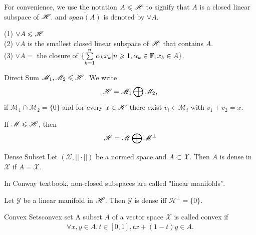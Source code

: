 For convenience, we use the notation $A\leqslant \mathscr{H}$ to signify  that $A$ is a closed linear subspace of $\mathscr{H}$.
and $\overline{span(A)}$ is denoted by $\vee A$.
\begin{proposition}{}{}
    (1) $\vee A\leqslant \mathscr{H}$\\
    (2) $\vee A$ is the smallest closed linear subspace of $\mathscr{H}$ that contains $A$.\\
    (3) $\vee A=$ the closure of $\{\sum\limits_{k=1}^{n}\alpha_kx_k|n\geqslant 1,\alpha_k\in \mathbb{F},x_k\in A\}$.
\end{proposition}



\begin{definition}{Direct Sum}{}
    $\mathscr{M}_1,\mathscr{M}_2\leqslant \mathscr{H}$. We write 
    \begin{align*}
        \mathscr{H}=\mathscr{M}_1 \bigoplus \mathscr{M}_2, 
    \end{align*} 
    if $\mathscr{M}_1\cap \mathscr{M}_2=\{0\}$ and for every $x\in\mathscr{H}$ there exist $v_i\in \mathscr{M}_i$ with $v_1+v_2=x$.
\end{definition}

\begin{proposition}{}{}
If $\mathscr{M}\leqslant \mathscr{H}$, then
    \begin{align*}
        \mathscr{H} = \mathscr{M}\bigoplus \mathscr{M}^{\perp}
    \end{align*}
\end{proposition}

\begin{definition}{Dense Subset}{}
    Let $(\mathscr{X},||\cdot||)$ be a normed space and $A\subset \mathscr{X}$. Then $A$ is dense in $\mathscr{X}$ if $\overline{A}=\mathscr{X}$. 
\end{definition}

In Conway textbook, non-closed subspaces are called "linear manifolds".

\begin{proposition}{}{}
    Let $\mathscr{Y}$ be a linear manifold in $\mathscr{H}$. Then $\mathscr{Y}$ is dense iff $\mathscr{H}^{\perp}=\{0\}$.
\end{proposition}


\begin{definition}{Convex Sets}{convex set}
    A subset $A$ of a vector space $\mathscr{X}$ is called convex if 
    \begin{align*}
        \forall x,y\in A, t\in [0,1], tx+(1-t)y\in A.
    \end{align*}
\end{definition}

